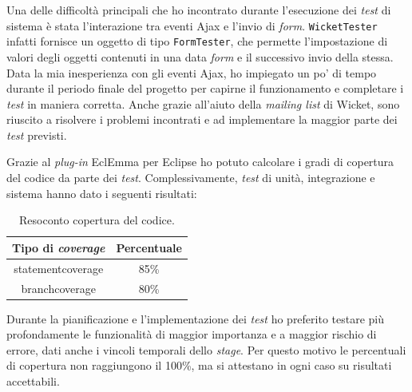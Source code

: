 	Una delle difficoltà principali che ho incontrato durante l'esecuzione dei \textit{test} di sistema è stata l'interazione tra eventi Ajax e l'invio di \textit{form}. \texttt{WicketTester} infatti fornisce un oggetto di tipo \texttt{FormTester}, che permette l'impostazione di valori degli oggetti contenuti in una data \textit{form} e il successivo invio della stessa. Data la mia inesperienza con gli eventi Ajax, ho impiegato un po' di tempo durante il periodo finale del progetto per capirne il funzionamento e completare i \textit{test} in maniera corretta. Anche grazie all'aiuto della \textit{mailing list} di Wicket, sono riuscito a risolvere i problemi incontrati e ad implementare la maggior parte dei \textit{test} previsti. 
%	
%	  
%	

	Grazie al \textit{plug-in} EclEmma per Eclipse ho potuto calcolare i gradi di copertura del codice da parte dei \textit{test}. Complessivamente, \textit{test} di unità, integrazione e sistema hanno dato i seguenti risultati:
	\begin{table}[H]
		\centering
		\begin{tabular}{|c|c|}
			\hline
			\textbf{Tipo di \textit{coverage}} & \textbf{Percentuale} \\
			\hline
			\gls{statementcoverage} & 85\% \\
			\hline
			\gls{branchcoverage} & 80\%\\
			\hline
		\end{tabular}
		\caption{Resoconto copertura del codice.}
	\end{table}
	Durante la pianificazione e l'implementazione dei \textit{test} ho preferito testare più profondamente le funzionalità di maggior importanza e a maggior rischio di errore, dati anche i vincoli temporali dello \textit{stage}. Per questo motivo le percentuali di copertura non raggiungono il 100\%, ma si attestano in ogni caso su risultati accettabili.
	
